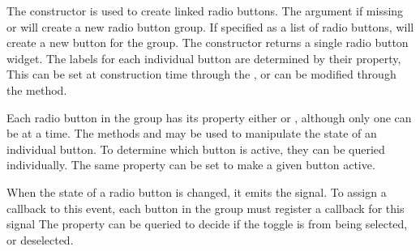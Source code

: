 The  constructor is used to create linked
radio buttons.  The argument  if
missing or  will create a new radio button group. If
specified as a list of radio buttons, will create a new button for the
group.  The constructor returns a single radio button widget.  The
labels for each individual button are determined by their 
property, This can be set at construction time through the
, or can be modified through the
 method.

Each radio button in the group has its  property either
 or , although only one can be  at a
time. The methods  and  may be used to manipulate the state of an individual button. To determine which button is active, they can be queried
individually. The same property can be set to make a given button
active.  

When the state of a radio button is changed, it emits the
 signal. To assign a callback to this event, each
button in the group must register a callback for this signal The
 property can be queried to decide if the toggle is from
being selected, or deselected.


